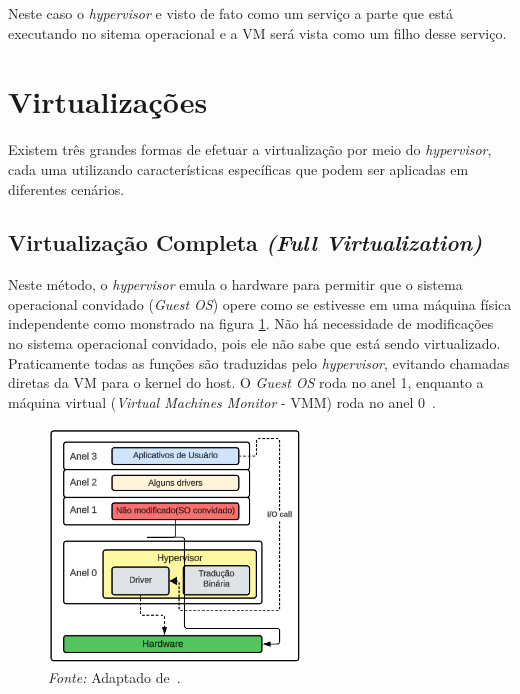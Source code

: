 Neste caso o \textit{hypervisor} e visto de fato como um serviço a parte que está executando no sitema operacional e a VM será vista como um filho desse serviço.


\section{Virtualizações}

Existem três grandes formas de efetuar a virtualização por meio do \textit{hypervisor}, cada uma utilizando características específicas que podem ser aplicadas em diferentes cenários.

\subsection{Virtualização Completa \textit{(Full Virtualization)}}

Neste método, o \textit{hypervisor} emula o hardware para permitir que o sistema operacional convidado (\textit{Guest OS}) opere como se estivesse em uma máquina física independente como monstrado na figura \ref{fig:full_virtualization_rings}. Não há necessidade de modificações no sistema operacional convidado, pois ele não sabe que está sendo virtualizado. Praticamente todas as funções são traduzidas pelo \textit{hypervisor}, evitando chamadas diretas da VM para o kernel do host. O \textit{Guest OS} roda no anel 1, enquanto a máquina virtual (\textit{Virtual Machines Monitor} - VMM) roda no anel 0~\citep{chirammal2016mastering}.

\begin{figure}[htbp]
  \centering
  \caption{Virtualização completa nos anéis de segurança. A figura demonstra o \textit{Guest OS} operando no anel 1 e o VMM no anel 0, com o \textit{hypervisor} realizando a emulação.}
  \includegraphics[width=0.6\textwidth]{images/full_virtualization_rings.png}
  \caption*{\textit{Fonte:} Adaptado de~\citep{chirammal2016mastering}.}
  \label{fig:full_virtualization_rings}
\end{figure}


